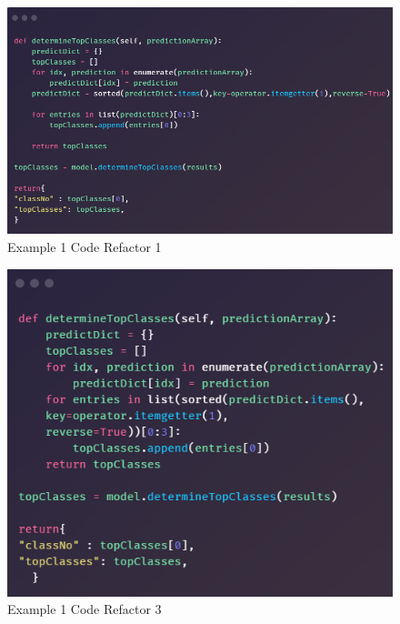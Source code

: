       \begin{figure}[H]
        \begin{center}
          \includegraphics[scale=0.55]{Images/Refactor/refactorA2}
          \caption{Example 1 Code Refactor 1}
          \label{fig:refactorA2}
        \end{center}
      \end{figure}

      \begin{figure}[H]
        \begin{center}
          \includegraphics[scale=0.55]{Images/Refactor/refactorA3}
          \caption{Example 1 Code Refactor 3}
          \label{fig:refactorA3}
        \end{center}
      \end{figure}

